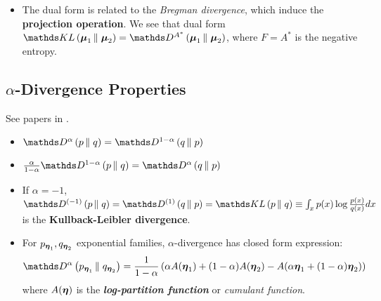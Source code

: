 \documentclass[11pt]{article}
\begin{document}
\begin{itemize}
\item The dual form is related to the \emph{Bregman divergence}, which induce the \textbf{projection operation}.  We see that dual form $\kl{\mb{\mu}_1}{\mb{\mu}_2} = \divg{A^{*}}{\mb{\mu}_1}{\mb{\mu}_2}$, where $F = A^{*}$ is the negative entropy.
\end{itemize}

\subsection{$\alpha$-Divergence Properties}
See papers in \citep{hero2001alpha, nielsen2011r, poczos2011estimation}.
\begin{itemize}
\item $\divg{\alpha}{p}{q} = \divg{1-\alpha}{q}{p}$
\item $\frac{\alpha}{1 - \alpha}\divg{1-\alpha}{p}{q} = \divg{\alpha}{q}{p}$
\item If $\alpha = -1$, $\divg{(-1)}{p}{q} =\divg{(1)}{q}{p} = \kl{p}{q} \equiv \int_{x} p(x)\log\frac{p(x)}{q(x)} dx $ is the \textbf{Kullback-Leibler divergence}. 
\item For $p_{\boldsymbol{\eta}_1}, q_{\boldsymbol{\eta}_2}$ exponential families, $\alpha$-divergence has closed form expression:
\begin{align}
\divg{\alpha}{p_{\mb{\eta}_1}}{q_{\mb{\eta}_2}} &= \frac{1}{1- \alpha}\paren{\alpha A(\mb{\eta}_1) + (1-\alpha) A(\mb{\eta}_2) - A(\alpha \mb{\eta}_1 + (1- \alpha)\mb{\eta}_2)} \label{eqn: alpha_divg_exp_fam}
\end{align} where $A(\boldsymbol{\eta})$ is the \textbf{\emph{log-partition function}} or \emph{cumulant function}.
\end{itemize}
\end{document}
